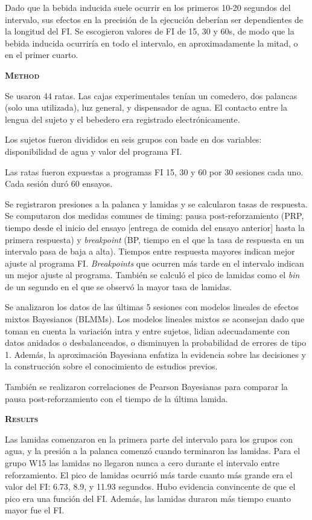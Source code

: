 \documentclass[a4paper,12pt]{article}
\begin{document}
Dado que la bebida inducida suele ocurrir en los primeros 10-20 segundos del intervalo, sus efectos en la precisión de la ejecución deberían ser dependientes de la longitud del FI. Se escogieron valores de FI de 15, 30 y 60s, de modo que la bebida inducida ocurriría en todo el intervalo, en aproximadamente la mitad, o en el primer cuarto.

{\scshape\bfseries Method}

Se usaron 44 ratas. Las cajas experimentales tenían un comedero, dos palancas (solo una utilizada), luz general, y dispensador de agua. El contacto entre la lengua del sujeto y el bebedero era registrado electrónicamente.

Los sujetos fueron divididos en seis grupos con bade en dos variables: disponibilidad de agua y valor del programa FI.

Las ratas fueron expuestas a programas FI 15, 30 y 60 por 30 sesiones cada uno. Cada sesión duró 60 ensayos.

Se registraron presiones a la palanca y lamidas y se calcularon tasas de respuesta. Se computaron dos medidas comunes de timing: pausa post-reforzamiento (PRP, tiempo desde el inicio del ensayo [entrega de comida del ensayo anterior] hasta la primera respuesta) y {\itshape breakpoint} (BP, tiempo en el que la tasa de respuesta en un intervalo pasa de baja a alta). Tiempos entre respuesta mayores indican mejor ajuste al programa FI. {\itshape Breakpoints} que ocurren más tarde en el intervalo indican un mejor ajuste al programa. También se calculó el pico de lamidas como el {\itshape bin} de un segundo en el que se observó la mayor tasa de lamidas.

Se analizaron los datos de las últimas 5 sesiones con modelos lineales de efectos mixtos Bayesianos (BLMMs). Los modelos lineales mixtos se aconsejan dado que toman en cuenta la variación intra y entre sujetos, lidian adecuadamente con datos anidados o desbalanceados, o disminuyen la probabilidad de errores de tipo 1. Además, la aproximación Bayesiana enfatiza la evidencia sobre las decisiones y la construcción sobre el conocimiento de estudios previos.

También se realizaron correlaciones de Pearson Bayesianas para comparar la pausa post-reforzamiento con el tiempo de la última lamida. 

{\scshape\bfseries Results}

Las lamidas comenzaron en la primera parte del intervalo para los grupos con agua, y la presión a la palanca comenzó cuando terminaron las lamidas. Para el grupo W15 las lamidas no llegaron nunca a cero durante el intervalo entre reforzamiento. El pico de lamidas ocurrió más tarde cuanto más grande era el valor del FI: 6.73, 8.9, y 11.93 segundos. Hubo evidencia convincente de que el pico era una función del FI. Además, las lamidas duraron más tiempo cuanto mayor fue el FI. 
\end{document}
